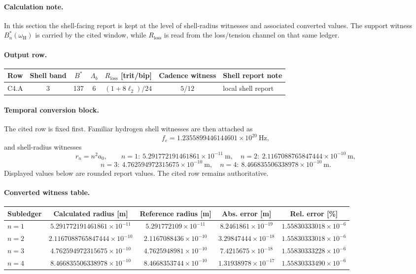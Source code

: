 \paragraph{Calculation note.} In this section the shell-facing report is kept at the level of shell-radius witnesses and associated converted values. The support witness $B_n^*(\omega_{\mathrm{H}})$ is carried by the cited window, while $R_{\mathrm{loss}}$ is read from the loss/tension channel on that same ledger.

\paragraph{Output row.}
\begin{center}
\small
\begin{tabularx}{\linewidth}{@{}lcccccX@{}}
\toprule
Row & Shell band & $B^*$ & $\Lambda_b$ & $R_{\mathrm{loss}}$ [trit/bip] & Cadence witness & Shell report note \\
\midrule
C4.A & 3 & 137 & 6 & $(1+8\ell_2)/24$ & $5/12$ & local shell report \\
\bottomrule
\end{tabularx}
\end{center}

\paragraph{Temporal conversion block.} The cited row is fixed first. Familiar hydrogen shell witnesses are then attached as
\[
f_e = 1.2355899446144601\times 10^{20}\ \text{Hz},
\]
and shell-radius witnesses
\[
r_n = n^2 a_0,\qquad
n=1:\ 5.291772191461861\times 10^{-11}\ \text{m},\quad
n=2:\ 2.1167088765847444\times 10^{-10}\ \text{m},
\]
\[
n=3:\ 4.762594972315675\times 10^{-10}\ \text{m},\quad
n=4:\ 8.466835506338978\times 10^{-10}\ \text{m}.
\]
Displayed values below are rounded report values. The cited row remains authoritative.


\paragraph{Converted witness table.}
\begin{center}
\footnotesize
\begin{tabularx}{\linewidth}{@{}lcccc@{}}
\toprule
Subledger & Calculated radius [m] & Reference radius [m] & Abs. error [m] & Rel. error [\%] \\
\midrule
$n=1$ & $5.291772191461861\times10^{-11}$ & $5.291772109\times10^{-11}$ & $8.2461861\times10^{-19}$ & $1.55830333018\times10^{-6}$ \\
$n=2$ & $2.1167088765847444\times10^{-10}$ & $2.1167088436\times10^{-10}$ & $3.29847444\times10^{-18}$ & $1.55830333018\times10^{-6}$ \\
$n=3$ & $4.762594972315675\times10^{-10}$ & $4.7625948981\times10^{-10}$ & $7.4215675\times10^{-18}$ & $1.55830333228\times10^{-6}$ \\
$n=4$ & $8.466835506338978\times10^{-10}$ & $8.4668353744\times10^{-10}$ & $1.31938978\times10^{-17}$ & $1.55830333490\times10^{-6}$ \\
\bottomrule
\end{tabularx}
\end{center}

